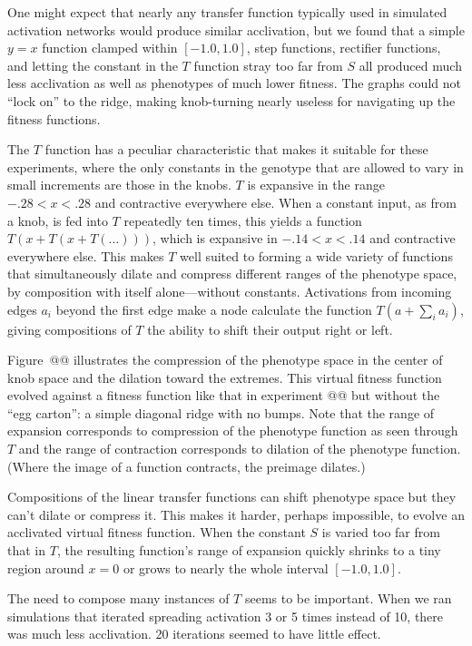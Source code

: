 \documentclass[letterpaper]{article}
\begin{document}
One might expect that nearly any transfer function typically used in simulated
activation networks would produce similar acclivation, but we found that a
simple $y=x$ function clamped within $[-1.0, 1.0]$, step functions, rectifier
functions, and letting the constant in the $T$ function stray too far from $S$
all produced much less acclivation as well as phenotypes of much lower fitness.
The graphs could not ``lock on'' to the ridge, making knob-turning nearly
useless for navigating up the fitness functions.

The $T$ function has a peculiar characteristic that makes it suitable for
these experiments, where the only constants in the genotype that are allowed to
vary in small increments are those in the knobs. $T$ is expansive in the range
$-.28 < x < .28$ and contractive everywhere else. When a constant input, as
from a knob, is fed into $T$ repeatedly ten times, this yields a function
$T(x+T(x+T(\ldots)))$, which is expansive in $-.14 < x < .14$ and contractive
everywhere else. This makes $T$ well suited to forming a wide variety of
functions that simultaneously dilate and compress different ranges of the
phenotype space, by composition with itself alone---without constants.
Activations from incoming edges $a_{i}$ beyond the first edge make a node
calculate the function $T(a + \sum_i a_i)$, giving compositions of $T$ the
ability to shift their output right or left.

Figure~@@ illustrates the compression of the phenotype space in the center of
knob space and the dilation toward the extremes. This virtual fitness function
evolved against a fitness function like that in experiment @@ but without the
``egg carton'': a simple diagonal ridge with no bumps. Note that the range of
expansion corresponds to compression of the phenotype function as seen through
$T$ and the range of contraction corresponds to dilation of the phenotype
function. (Where the image of a function contracts, the preimage dilates.)

Compositions of the linear transfer functions can shift phenotype space but they
can't dilate or compress it. This makes it harder, perhaps impossible, to
evolve an acclivated virtual fitness function. When the constant $S$ is varied
too far from that in $T$, the resulting function's range of expansion quickly
shrinks to a tiny region around $x=0$ or grows to nearly the whole interval
$[-1.0, 1.0]$.

The need to compose many instances of $T$ seems to be important. When we ran
simulations that iterated spreading activation 3 or 5 times instead of 10,
there was much less acclivation. 20 iterations seemed to have little effect.
\end{document}

